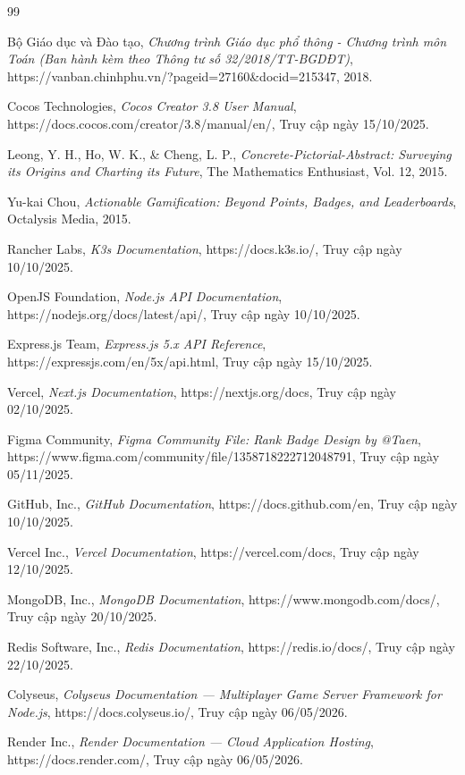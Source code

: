 \clearpage
{}
\renewcommand{\refname}{Tài liệu tham khảo}

\begin{thebibliography}{99}
	
	Bộ Giáo dục và Đào tạo,
	\textit{Chương trình Giáo dục phổ thông - Chương trình môn Toán (Ban hành kèm theo Thông tư số 32/2018/TT-BGDĐT)},
	https://vanban.chinhphu.vn/?pageid=27160&docid=215347,
	2018.
	
	Cocos Technologies, 
	\textit{Cocos Creator 3.8 User Manual},  
	https://docs.cocos.com/creator/3.8/manual/en/,  
	Truy cập ngày 15/10/2025.
	
	Leong, Y. H., Ho, W. K., \& Cheng, L. P.,
	\textit{Concrete-Pictorial-Abstract: Surveying its Origins and Charting its Future},
	The Mathematics Enthusiast, Vol. 12, 2015.
	
	Yu-kai Chou,
	\textit{Actionable Gamification: Beyond Points, Badges, and Leaderboards},
	Octalysis Media, 2015.
	
	Rancher Labs,  
	\textit{K3s Documentation},  
	https://docs.k3s.io/,  
	Truy cập ngày 10/10/2025.
	
	OpenJS Foundation,  
	\textit{Node.js API Documentation},  
	https://nodejs.org/docs/latest/api/,  
	Truy cập ngày 10/10/2025.
	
	Express.js Team,  
	\textit{Express.js 5.x API Reference},  
	https://expressjs.com/en/5x/api.html,  
	Truy cập ngày 15/10/2025.
	
	Vercel, 
	\textit{Next.js Documentation}, 
	https://nextjs.org/docs, 
	Truy cập ngày 02/10/2025.
	
	Figma Community,
	\textit{Figma Community File: Rank Badge Design by @Taen},
	https://www.figma.com/community/file/1358718222712048791,
	Truy cập ngày 05/11/2025.
	
	GitHub, Inc.,
	\textit{GitHub Documentation},
	https://docs.github.com/en,
	Truy cập ngày 10/10/2025.
	
	Vercel Inc.,
	\textit{Vercel Documentation},
	https://vercel.com/docs,
	Truy cập ngày 12/10/2025.
	
	
	MongoDB, Inc.,
	\textit{MongoDB Documentation},
	https://www.mongodb.com/docs/,
	Truy cập ngày 20/10/2025.
	
	Redis Software, Inc.,
	\textit{Redis Documentation},
	https://redis.io/docs/,
	Truy cập ngày 22/10/2025.

	Colyseus,
	\textit{Colyseus Documentation — Multiplayer Game Server Framework for Node.js},
	https://docs.colyseus.io/,
	Truy cập ngày 06/05/2026.

	Render Inc.,
	\textit{Render Documentation — Cloud Application Hosting},
	https://docs.render.com/,
	Truy cập ngày 06/05/2026.
	
\end{thebibliography}